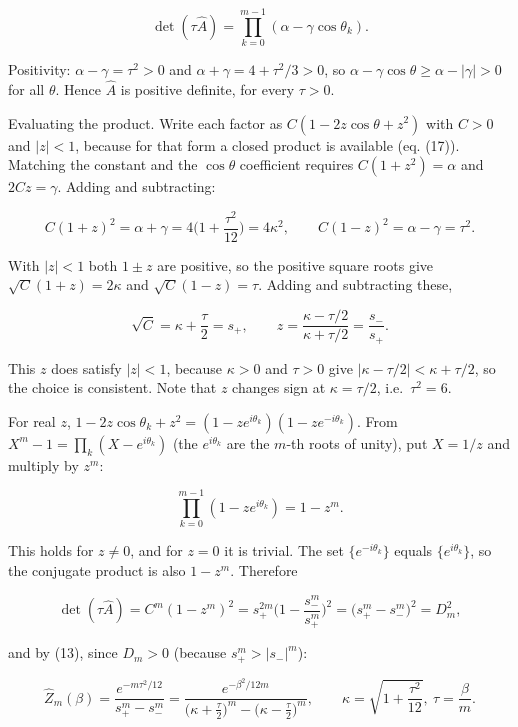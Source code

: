 \documentclass[11pt,a4paper]{article}
\newcommand{\tagmark}[1]{\marginnote{\scriptsize\ttfamily #1}}
\newcommand{\Dtag}{\tagmark{[D]}}   %
\begin{document}
\[
\det(\tau\hat A) = \prod_{k=0}^{m-1}(\alpha - \gamma\cos\theta_k). \tag{15}
\]

Positivity: \(\alpha - \gamma = \tau^2 > 0\) and
\(\alpha+\gamma = 4 + \tau^2/3 > 0\), so
\(\alpha - \gamma\cos\theta \ge \alpha - |\gamma| > 0\) for all
\(\theta\). Hence \(\hat A\) is positive definite, for every \(\tau>0\).

Evaluating the product. Write each factor as
\(C(1 - 2z\cos\theta + z^2)\) with \(C>0\) and \(|z|<1\), because for
that form a closed product is available (eq. (17)). Matching the
constant and the \(\cos\theta\) coefficient requires
\(C(1+z^2) = \alpha\) and \(2Cz = \gamma\). Adding and subtracting:

\[
C(1+z)^2 = \alpha+\gamma = 4\Big(1+\frac{\tau^2}{12}\Big) = 4\kappa^2,\qquad C(1-z)^2 = \alpha-\gamma = \tau^2.
\]

\Dtag{} With \(|z|<1\) both \(1\pm z\) are positive, so the positive
square roots give \(\sqrt C(1+z) = 2\kappa\) and
\(\sqrt C(1-z) = \tau\). Adding and subtracting these,

\[
\sqrt C = \kappa + \frac\tau2 = s_+,\qquad z = \frac{\kappa - \tau/2}{\kappa+\tau/2} = \frac{s_-}{s_+}. \tag{16}
\]

This \(z\) does satisfy \(|z|<1\), because \(\kappa>0\) and \(\tau>0\)
give \(|\kappa - \tau/2| < \kappa+\tau/2\), so the choice is consistent.
Note that \(z\) changes sign at \(\kappa = \tau/2\),
i.e.~\(\tau^2 = 6\).

For real \(z\),
\(1 - 2z\cos\theta_k + z^2 = (1-ze^{i\theta_k})(1-ze^{-i\theta_k})\).
From \(X^m - 1 = \prod_k(X - e^{i\theta_k})\) (the \(e^{i\theta_k}\) are
the \(m\)-th roots of unity), put \(X = 1/z\) and multiply by \(z^m\):

\[
\prod_{k=0}^{m-1}(1 - ze^{i\theta_k}) = 1 - z^m. \tag{17}
\]

\Dtag{} This holds for \(z\ne0\), and for \(z=0\) it is trivial. The set
\(\{e^{-i\theta_k}\}\) equals \(\{e^{i\theta_k}\}\), so the conjugate
product is also \(1-z^m\). Therefore

\[
\det(\tau\hat A) = C^m(1-z^m)^2 = s_+^{2m}\Big(1 - \frac{s_-^m}{s_+^m}\Big)^2 = \big(s_+^m - s_-^m\big)^2 = D_m^2,
\]

and by (13), since \(D_m>0\) (because \(s_+^m > |s_-|^m\)):

\[
\boxed{\,\hat Z_m(\beta) = \frac{e^{-m\tau^2/12}}{s_+^m - s_-^m} = \frac{e^{-\beta^2/12m}}{\big(\kappa+\frac\tau2\big)^m - \big(\kappa-\frac\tau2\big)^m},\qquad \kappa = \sqrt{1+\frac{\tau^2}{12}},\ \tau = \frac\beta m.\,} \tag{18}
\]
\end{document}

